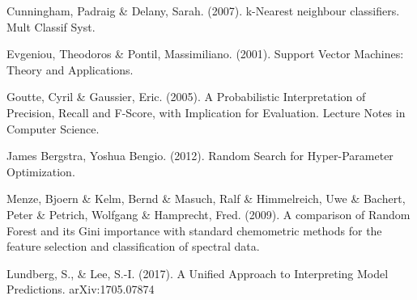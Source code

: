 \documentclass[conference]{IEEEtran}
\begin{document}
\begin{thebibliography}{00}
Cunningham, Padraig \& Delany, Sarah. (2007). k-Nearest neighbour classifiers. Mult Classif Syst. 

Evgeniou, Theodoros \& Pontil, Massimiliano. (2001). Support Vector Machines: Theory and Applications.

Goutte, Cyril \& Gaussier, Eric. (2005). A Probabilistic Interpretation of Precision, Recall and F-Score, with Implication for Evaluation. Lecture Notes in Computer Science.

James Bergstra, Yoshua Bengio. (2012). Random Search for Hyper-Parameter Optimization.

Menze, Bjoern \& Kelm, Bernd \& Masuch, Ralf \& Himmelreich, Uwe \& Bachert, Peter \& Petrich, Wolfgang & Hamprecht, Fred. (2009). A comparison of Random Forest and its Gini importance with standard chemometric methods for the feature selection and classification of spectral data.

Lundberg, S., \& Lee, S.-I. (2017). A Unified Approach to Interpreting Model Predictions. arXiv:1705.07874

\end{thebibliography}
\end{document}
